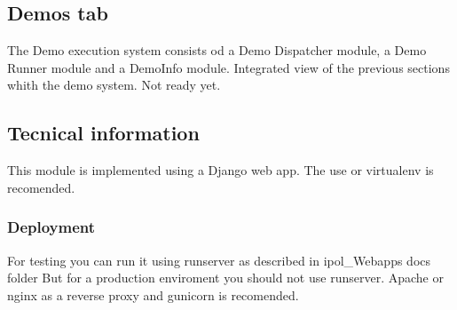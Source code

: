 \subsection{Demos tab}
The Demo execution system consists od a Demo Dispatcher module, a Demo Runner module and a DemoInfo module.
Integrated view of the previous sections whith the demo system.
Not ready yet.

\subsection{Tecnical information}
This module is implemented using a Django web app.
The use or virtualenv is recomended.

\subsubsection{Deployment}
For testing you can run it using runserver as described in ipol\_Webapps docs folder
But for a production enviroment you should not use runserver. Apache or nginx as a reverse proxy and gunicorn is recomended.